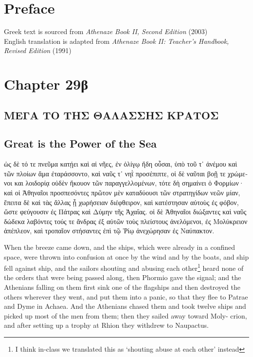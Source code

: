 \documentclass{article}
\begin{document}
\section{Preface}

Greek text is sourced from \emph{Athenaze Book II, Second Edition} (2003) \\
English translation is adapted from \emph{Athenaze Book II: Teacher's Handbook, Revised Edition} (1991)

\section{Chapter 29\textgreek{β}}

\subsection*{\textgreek{ΜΕΓΑ ΤΟ ΤΗΣ ΘΑΛΑΣΣΗΣ ΚΡΑΤΟΣ}}
\subsection*{Great is the Power of the Sea}

\begin{greek}
ὡς δὲ τό τε πνεῦμα κατῄει καὶ αἱ νῆες, ἐν ὀλίγῳ ἤδη οὖσαι,
ὑπὸ τοῦ τ᾿ ἀνέμου καὶ τῶν πλοίων ἅμα ἐταράσσοντο, καὶ ναῦς τ᾿ νηῒ προσέπιπτε,
οἱ δὲ ναῦται βοῇ τε χρώμενοι και λοιδορίᾳ οὐδὲν ἤκουον τῶν παραγγελλομένων, τότε δὴ σημαίνει ὁ Φορμίων·
καὶ οἱ Ἀθηναῖοι προσπεσόντες πρῶτον μὲν καταδύουσι τῶν στρατηγίδων νεῶν μίαν, ἔπειτα δὲ καὶ τὰς ἄλλας ᾗ χωρήσειαν διέφθειρον,
καὶ κατέστησαν αὐτοὺς ἐς φόβον, ὥστε φεύγουσιν ἐς Πάτρας καὶ Δύμην τῆς Ἀχαΐας.
οἱ δὲ Ἀθηναῖοι διώξαντες καὶ ναῦς δώδεκα λαβόντες τούς τε ἄνδρας ἐξ αὐτῶν τοὺς πλείστους ἀνελόμενοι,
ἐς Μολύκρειον ἀπέπλεον, καὶ τροπαῖον στήσαντες ἐπὶ τῷ Ῥίῳ ἀνεχώρησαν ἐς Ναύπακτον. \\
\end{greek}


When the breeze came down, and the ships, which were already in a confined space, were thrown into confusion at once by the wind and by the boats,
and ship fell against ship, and the sailors shouting and abusing each other\footnote{I think in-class we translated this as `shouting abuse at each other' instead}
heard none of the orders that were being passed along,
then Phormio gave the signal; and the Athenians falling on them first sink one of the flagships and then destroyed the others wherever they went,
and put them into a panic, so that they flee to Patrae and Dyme in Achaea.
And the Athenians chased them and took twelve ships and picked up most of the men from them;
then they sailed away toward Moly- crion,
and after setting up a trophy at Rhion they withdrew to Naupactus. \\
\end{document}

